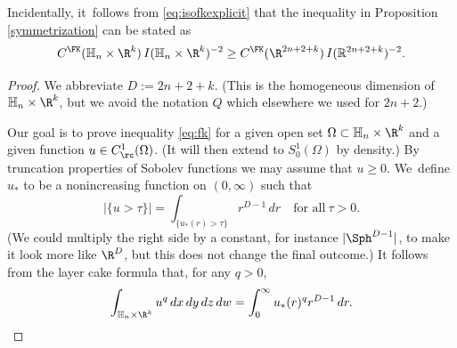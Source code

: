 Incidentally, it~follows from \eqref{eq:isofkexplicit} that the inequality in Proposition \ref{symmetrization} can be stated as
\begin{equation}
\label{eq:symmetrization}
C^\FK(\mathbb H_n\times\R^k)\,I(\mathbb H_n\times\R^k)^{-2} \geq
C^\FK(\R^{2n+2+k}) \,I(\mathbb R^{2n+2+k})^{-2}.
\end{equation}

\begin{proof}
We abbreviate $D := 2n+2+k$. (This is the homogeneous dimension of $\mathbb H_n\times\R^k$, but we avoid the notation $Q$ which elsewhere we used for $2n+2$.)

Our goal is to prove inequality \eqref{eq:fk} for a given open set $\Omega\subset\mathbb H_n\times\R^k$ and a given function $u\in C^1_\rc(\Omega)$. (It will then extend to $S^1_0(\Omega)$ by density.) By truncation properties of Sobolev functions we may assume that $u\geq 0$. We~define $u_*$ to be a nonincreasing function on $(0,\infty)$ such that
\[
|\{ u >\tau \}| = \int_{\{u_*(r)>\tau\}} r^{D-1}\,dr
\quad\text{for all}\ \tau>0.
\]
(We could multiply the right side by a constant, for instance $|\Sph^{D-1}|$, to make it look more like $\R^D$, but this does not change the final outcome.) It follows from the layer cake formula that, for any $q>0$,
\begin{equation}
\label{eq:layercake}
\int_{\mathbb H_n\times\R^k} u^q\,dx\,dy\,dz\,dw = \int_0^\infty u_*(r)^q r^{D-1}\,dr.
\end{equation}


\end{proof}
